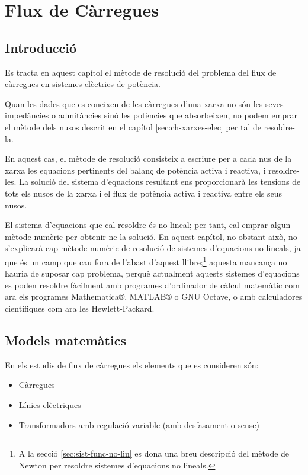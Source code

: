 
\chapter{Flux de Càrregues}
\label{sec:ch-flux-carregues}

\section{Introducció}

Es tracta en aquest capítol el mètode de resolució del problema del flux de càrregues en
sistemes elèctrics de potència.

Quan les dades que es coneixen de les càrregues d'una xarxa no són
les seves impedàncies o admitàncies sinó les potències que
absorbeixen, no podem emprar el mètode dels nusos descrit en el
capítol \ref{sec:ch-xarxes-elec} per tal de resoldre-la.

En aquest cas, el mètode de resolució consisteix a escriure per a cada
nus de la xarxa les equacions pertinents del balanç de potència activa i
reactiva, i resoldre-les. La solució del sistema d'equacions
resultant ens proporcionarà les tensions de tots els nusos de la
xarxa i el flux de potència activa i reactiva entre els seus nusos.

El sistema d'equacions que cal resoldre és no lineal;  per tant,
cal emprar algun mètode numèric per obtenir-ne la solució. En aquest capítol, no obstant això, no
s'explicarà cap mètode numèric de resolució de sistemes d'equacions
no lineals, ja que és un camp que cau fora de l'abast d'aquest llibre;\footnote{A la secció \ref{sec:sist-func-no-lin} es dona una breu descripció del mètode de Newton per resoldre sistemes d'equacions no lineals.} aquesta mancança  no hauria de suposar cap problema, perquè actualment aquests
sistemes d'equacions es poden resoldre fàcilment amb programes
d'ordinador de càlcul matemàtic com ara els programes
Mathematica®, MATLAB® o GNU Octave, o amb calculadores
científiques com ara les Hewlett-Packard.

\section{Models matemàtics} 

En els estudis de flux de càrregues els elements que es consideren són:
\begin{itemize}
   \item Càrregues
   \item Línies elèctriques
   \item Transformadors amb regulació variable (amb desfasament o sense)
\end{itemize}

